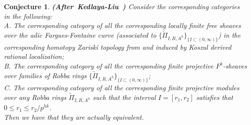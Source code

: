 \documentclass[12pt]{amsart}
\newtheorem{conjecture}[theorem]{Conjecture}
\theoremstyle{definition}
\numberwithin{equation}{section}
\begin{document}
\begin{conjecture}\mbox{\bf{(After Kedlaya-Liu \cite[Theorem 4.6.1]{KL2})}}
Consider the corresponding categories in the following:\\
A. The corresponding category of all the corresponding locally finite free sheaves over the adic Fargues-Fontaine curve (associated to $\{\widetilde{\Pi}_{I,R,A^h}\}_{\{I\subset (0,\infty)\}}$) in the corresponding homotopy Zariski topology from \cite{BK1} and \cite{BBBK} induced by Koszul derived rational localization;\\
B. The corresponding category of all the corresponding finite projective $F^k$-sheaves over families of Robba rings $\{\widetilde{\Pi}_{I,R,A^h}\}_{\{I\subset (0,\infty)\}}$;\\
C. The corresponding category of all the corresponding finite projective modules over any Robba rings $\widetilde{\Pi}_{I,R,A^h}$ such that the interval $I=[r_1,r_2]$ satisfies that $0\leq r_1 \leq r_2/p^{hk}$.\\
Then we have that they are actually equivalent. 


\end{conjecture}
\end{document}
